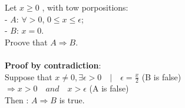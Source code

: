 \documentclass{article}
\begin{document}
\noindent Let $x \geq 0$ , with tow porpositions:\\
- $A$: $\forall > 0$, $0 \leq x \leq \epsilon$;\\
- $B$: $x = 0$.\\
\noindent Proove that $A \Rightarrow B$.\\\\
\noindent \textbf{Proof by contradiction}:\\
Suppose that $x \neq 0, \exists \epsilon > 0 \quad|\quad
\epsilon = \frac{x}{2} $ (B is false)\\
$\Rightarrow x > 0 \quad and \quad x > \epsilon$ (A is false)\\
Then : $A \Rightarrow B$ is true.
\end{document}
